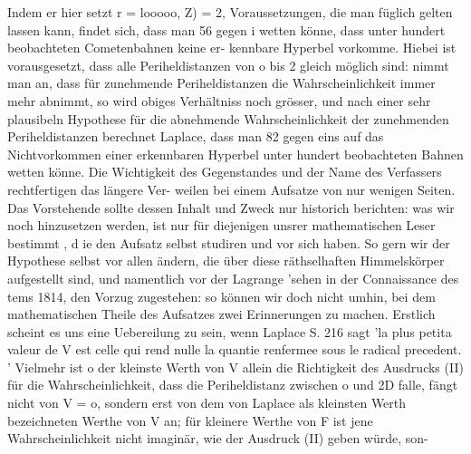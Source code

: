 \documentclass[12pt,a4paper]{article}
\begin{document}
Indem er hier setzt r = looooo, Z) = 2, Voraussetzungen, die man füglich gelten lassen kann, findet\newline
sich, dass man 56 gegen i wetten könne, dass unter hundert beobachteten Cometenbahnen keine er-\newline
kennbare Hyperbel vorkomme. Hiebei ist vorausgesetzt, dass alle Periheldistanzen von o bis 2 gleich\newline
möglich sind: nimmt man an, dass für zunehmende Periheldistanzen die Wahrscheinlichkeit immer\newline
mehr abnimmt, so wird obiges Verhältniss noch grösser, und nach einer sehr plausibeln Hypothese für\newline
die abnehmende Wahrscheinlichkeit der zunehmenden Periheldistanzen berechnet Laplace, dass man 82\newline
gegen eins auf das Nichtvorkommen einer erkennbaren Hyperbel unter hundert beobachteten Bahnen\newline
wetten könne.\newline
Die Wichtigkeit des Gegenstandes und der Name des Verfassers rechtfertigen das längere Ver-\newline
weilen bei einem Aufsatze von nur wenigen Seiten. Das Vorstehende sollte dessen Inhalt und Zweck\newline
nur historich berichten: was wir noch hinzusetzen werden, ist nur für diejenigen unsrer mathematischen\newline
Leser bestimmt , d ie den Aufsatz selbst studiren und vor sich haben. So gern wir der Hypothese selbst\newline
vor allen ändern, die über diese räthselhaften Himmelskörper aufgestellt sind, und namentlich vor der\newline
Lagrange 'sehen in der Connaissance des tems 1814, den Vorzug zugestehen: so können wir doch nicht\newline
umhin, bei dem mathematischen Theile des Aufsatzes zwei Erinnerungen zu machen. Erstlich scheint\newline
es uns eine Uebereilung zu sein, wenn Laplace S. 216 sagt 'la plus petita valeur de V est celle qui\newline
rend nulle la quantie renfermee sous le radical precedent. ' Vielmehr ist o der kleinste Werth von V\newline
allein die Richtigkeit des Ausdrucks (II)\newline
für die Wahrscheinlichkeit, dass die Periheldistanz zwischen o und 2D falle, fängt nicht von V = o,\newline
sondern erst von dem von Laplace als kleinsten Werth bezeichneten Werthe von V an; für kleinere\newline
Werthe von F ist jene Wahrscheinlichkeit nicht imaginär, wie der Ausdruck (II) geben würde, son-\newline
\end{document}
